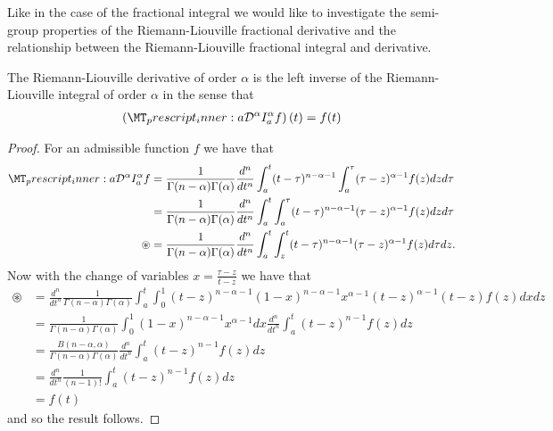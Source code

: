 Like in the case of the fractional integral we would like to investigate the semi-group properties of the Riemann-Liouville fractional derivative and the relationship between the Riemann-Liouville fractional integral and derivative.
\begin{mdframed}[innertopmargin=10pt]
\begin{lemma}
    \label{lem:rld_left_inverse}
    The Riemann-Liouville derivative of order $ \alpha $ is the left inverse of the Riemann-Liouville integral of order $ \alpha $ in the sense
    that
    \begin{align*}
        \left(\prescript{}{a}{\mathcal{D}}^\alpha I_a^\alpha f\right)(t) = f(t) 
    \end{align*}
\end{lemma}
\end{mdframed}
\begin{proof}
For an admissible function $ f $ we have that
\begin{align*}
    \prescript{}{a}{\mathcal{D}}^\alpha I_{a}^\alpha f &= \frac{1}{\Gamma(n-\alpha)\Gamma(\alpha)} \frac{d^n}{dt^n} \int_a^t (t-\tau)^{n-\alpha-1}\int_a^\tau (\tau - z)^{\alpha-1} f(z) dz d\tau \\
    &= \frac{1}{\Gamma(n-\alpha)\Gamma(\alpha)} \frac{d^n}{dt^n} \int_a^t \int_a^\tau (t-\tau)^{n-\alpha-1}(\tau - z)^{\alpha - 1}f(z)dzd\tau \\
    \circledast &= \frac{1}{\Gamma(n-\alpha)\Gamma(\alpha)} \frac{d^n}{dt^n} \int_a^t \int_z^t (t-\tau)^{n-\alpha-1}(\tau - z)^{\alpha - 1} f(z)d\tau dz.
\end{align*}
Now with the change of variables $ x = \frac{\tau - z}{t - z} $ we have that
\begin{align*}
    \circledast &= \frac{d^n}{dt^n}\frac{1}{\Gamma(n-\alpha)\Gamma(\alpha)}\int_a^t \int_0^1 (t-z)^{n-\alpha-1}(1-x)^{n-\alpha-1} x^{\alpha-1}(t-z)^{\alpha-1}(t-z)f(z)dxdz \\
    &= \frac{1}{\Gamma(n-\alpha)\Gamma(\alpha)} \int_0^1 (1-x)^{n-\alpha-1}x^{\alpha-1} dx \frac{d^n}{dt^n}\int_a^t (t-z)^{n-1}f(z)dz \\
    &= \frac{B(n-\alpha, \alpha)}{\Gamma(n-\alpha)\Gamma(\alpha)} \frac{d^n}{dt^n} \int_a^t (t-z)^{n-1}f(z)dz \\
    &= \frac{d^n}{dt^n} \frac{1}{(n-1)!} \int_{a}^t(t-z)^{n-1}f(z) dz \\
    &= f(t)
\end{align*}
and so the result follows.
\end{proof}


